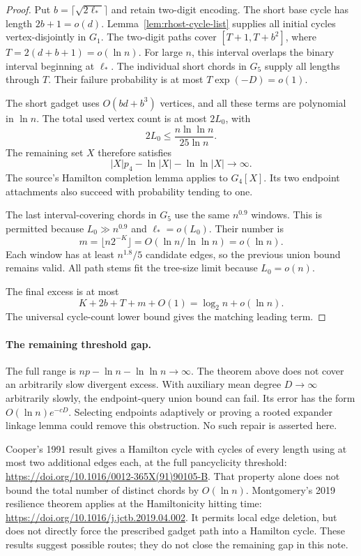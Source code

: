\begin{proof}
Put $b=\lceil\sqrt{2\ell_*}\rceil$ and retain two-digit encoding.
The short base cycle has length $2b+1=o(d)$.
Lemma~\ref{lem:rhost-cycle-list} supplies all initial cycles vertex-disjointly in $G_1$.
The two-digit paths cover $[T+1,T+b^2]$, where $T=2(d+b+1)=o(\ln n)$.
For large $n$, this interval overlaps the binary interval beginning at $\ell_*$.
The individual short chords in $G_5$ supply all lengths through $T$.
Their failure probability is at most $T\exp(-D)=o(1)$.

The short gadget uses $O(bd+b^3)$ vertices, and all these terms are polynomial in $\ln n$.
The total used vertex count is at most $2L_0$, with
\[
 2L_0\le\frac{n\ln\ln n}{25\ln n}.
\]
The remaining set $X$ therefore satisfies
\[
 |X|p_4-\ln|X|-\ln\ln|X|\to\infty.
\]
The source's Hamilton completion lemma applies to $G_4[X]$.
Its two endpoint attachments also succeed with probability tending to one.

The last interval-covering chords in $G_5$ use the same $n^{0.9}$ windows.
This is permitted because $L_0\gg n^{0.9}$ and $\ell_*=o(L_0)$.
Their number is
\[
 m=\lfloor n2^{-K}\rfloor=O(\ln n/\ln\ln n)=o(\ln n).
\]
Each window has at least $n^{1.8}/5$ candidate edges, so the previous union bound remains valid.
All path stems fit the tree-size limit because $L_0=o(n)$.

The final excess is at most
\[
 K+2b+T+m+O(1)=\log_2 n+o(\ln n).
\]
The universal cycle-count lower bound gives the matching leading term.
\end{proof}

\paragraph{The remaining threshold gap.}
The full range is $np-\ln n-\ln\ln n\to\infty$.
The theorem above does not cover an arbitrarily slow divergent excess.
With auxiliary mean degree $D\to\infty$ arbitrarily slowly, the endpoint-query union bound can fail.
Its error has the form $O(\ln n)e^{-cD}$.
Selecting endpoints adaptively or proving a rooted expander linkage lemma could remove this obstruction.
No such repair is asserted here.

Cooper's 1991 result gives a Hamilton cycle with cycles of every length using at most two additional edges each,
at the full pancyclicity threshold:
\url{https://doi.org/10.1016/0012-365X(91)90105-B}.
That property alone does not bound the total number of distinct chords by $O(\ln n)$.
Montgomery's 2019 resilience theorem applies at the Hamiltonicity hitting time:
\url{https://doi.org/10.1016/j.jctb.2019.04.002}.
It permits local edge deletion, but does not directly force the prescribed gadget path into a Hamilton cycle.
These results suggest possible routes; they do not close the remaining gap in this note.
